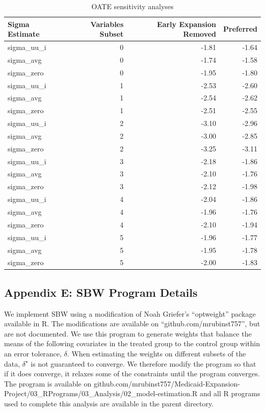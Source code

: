 \documentclass[12pt]{article}
\begin{document}
\begin{table}[ht]
\centering
\begin{tabular}{lrrr}
  \hline
Sigma Estimate & Variables Subset & Early Expansion Removed & Preferred \\ 
  \hline
sigma\_uu\_i & 0 & -1.81 & -1.64 \\ 
  sigma\_avg & 0 & -1.74 & -1.58 \\ 
  sigma\_zero & 0 & -1.95 & -1.80 \\ 
  sigma\_uu\_i & 1 & -2.53 & -2.60 \\ 
  sigma\_avg & 1 & -2.54 & -2.62 \\ 
  sigma\_zero & 1 & -2.51 & -2.55 \\ 
  sigma\_uu\_i & 2 & -3.10 & -2.96 \\ 
  sigma\_avg & 2 & -3.00 & -2.85 \\ 
  sigma\_zero & 2 & -3.25 & -3.11 \\ 
  sigma\_uu\_i & 3 & -2.18 & -1.86 \\ 
  sigma\_avg & 3 & -2.10 & -1.76 \\ 
  sigma\_zero & 3 & -2.12 & -1.98 \\ 
  sigma\_uu\_i & 4 & -2.04 & -1.86 \\ 
  sigma\_avg & 4 & -1.96 & -1.76 \\ 
  sigma\_zero & 4 & -2.10 & -1.94 \\ 
  sigma\_uu\_i & 5 & -1.96 & -1.77 \\ 
  sigma\_avg & 5 & -1.95 & -1.78 \\ 
  sigma\_zero & 5 & -2.00 & -1.83 \\ 
   \hline
\end{tabular}
\caption{OATE sensitivity analyses}
\label{oatesensitive}
\end{table}


\subsection{Appendix E: SBW Program Details}

We implement SBW using a modification of Noah Griefer's ``optweight'' package available in R. The modifications are available on ``github.com/mrubinst757'', but are not documented. We use this program to generate weights that balance the means of the following covariates in the treated group to the control group within an error tolerance, $\delta$. When estimating the weights on different subsets of the data, $\delta^\star$ is not guaranteed to converge. We therefore modify the program so that if it does converge, it relaxes some of the constraints until the program converges. The program is available on github.com/mrubinst757/Medicaid-Expansion-Project/03\_RPrograms/03\_Analysis/02\_model-estimation.R and all R programs used to complete this analysis are available in the parent directory.
\end{document}
